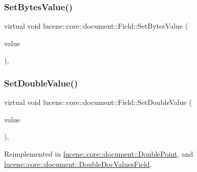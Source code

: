 \mbox{\label{classlucene_1_1core_1_1document_1_1Field_af61fb82abf8a917ccd5c9f252dcfa447}} 
\subsubsection{\texorpdfstring{Set\+Bytes\+Value()}{SetBytesValue()}\hspace{0.1cm}{\footnotesize\ttfamily [3/3]}}
{\footnotesize\ttfamily virtual void lucene\+::core\+::document\+::\+Field\+::\+Set\+Bytes\+Value (\begin{DoxyParamCaption}\item[{\mbox{\hyperlink{classlucene_1_1core_1_1util_1_1BytesRef}{lucene\+::core\+::util\+::\+Bytes\+Ref}} \&\&}]{value }\end{DoxyParamCaption})\hspace{0.3cm}{\ttfamily [inline]}, {\ttfamily [virtual]}}

\mbox{\label{classlucene_1_1core_1_1document_1_1Field_a8db791d4d1ebf77288d8529214413810}} 
\subsubsection{\texorpdfstring{Set\+Double\+Value()}{SetDoubleValue()}}
{\footnotesize\ttfamily virtual void lucene\+::core\+::document\+::\+Field\+::\+Set\+Double\+Value (\begin{DoxyParamCaption}\item[{const double}]{value }\end{DoxyParamCaption})\hspace{0.3cm}{\ttfamily [inline]}, {\ttfamily [virtual]}}



Reimplemented in \mbox{\hyperlink{classlucene_1_1core_1_1document_1_1DoublePoint_a71a14c1578c356e006c422f2c8a267b8}{lucene\+::core\+::document\+::\+Double\+Point}}, and \mbox{\hyperlink{classlucene_1_1core_1_1document_1_1DoubleDocValuesField_a1fe376e9158ee03034fd48fe259926ea}{lucene\+::core\+::document\+::\+Double\+Doc\+Values\+Field}}.

